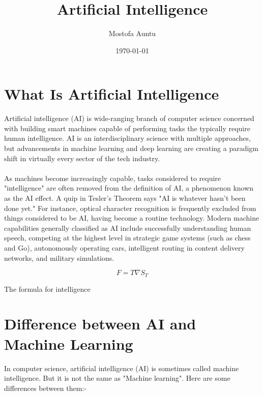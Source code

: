 \documentclass[a4paper, 12pt]{article}
\begin{document}
\title{\Large{\textbf{Artificial Intelligence}}}
\author{Mostofa Auntu}
\date{\today}
\maketitle

\tableofcontents

\section{What Is Artificial Intelligence}
Artificial intelligence (AI) is wide-ranging branch of computer science concerned with building smart machines capable of performing tasks the typically require human intelligence. AI is an interdisciplinary science with multiple approaches, but advancements in machine learning and deep learning are creating a paradigm shift in virtually every sector of the tech industry.\\ \\
As machines become increasingly capable, tasks considered to require "intelligence" are often removed from the definition of AI, a phenomenon known as the AI effect. A quip in Tesler's Theorem says "AI is whatever hasn't been done yet." For instance, optical character recognition is frequently excluded from things considered to be AI, having become a routine technology. Modern machine capabilities generally classified as AI include successfully understanding human speech, competing at the highest level in strategic game systems (such as chess and Go), autonomously operating cars, intelligent routing in content delivery networks, and military simulations.

$$F = T \nabla S_T$$
\begin{center} The formula for intelligence \end{center}

\section{Difference between AI and Machine Learning}
In computer science, artificial intelligence (AI) is sometimes called machine intelligence. But it is not the same as "Machine learning". Here are some differences between them:-
\end{document}
